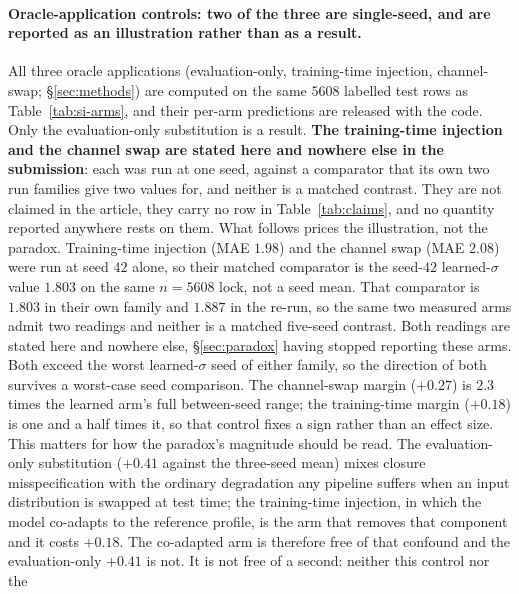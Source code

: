 \paragraph{Oracle-application controls: two of the three are single-seed, and are reported as an
illustration rather than as a result.} All three oracle applications (evaluation-only, training-time
injection, channel-swap; \S\ref{sec:methods}) are computed on the same $5608$ labelled test rows as
Table~\ref{tab:si-arms}, and their per-arm predictions are released with the code. Only the
evaluation-only substitution is a result. \textbf{The training-time injection and the channel swap
are stated here and nowhere else in the submission}: each was run at one seed, against a comparator
that its own two run families give two values for, and neither is a matched contrast. They are not
claimed in the article, they carry no row in Table~\ref{tab:claims}, and no quantity reported
anywhere rests on them. What follows prices the illustration, not the paradox.
Training-time injection (MAE $1.98$) and the channel swap (MAE $2.08$) were run at seed $42$ alone,
so their matched comparator is the seed-$42$ learned-$\sigma$ value $1.803$ on the same $n{=}5608$
lock, not a seed mean. That comparator is $1.803$ in their own family and $1.887$ in the re-run, so the same two measured
arms admit two readings and neither is a matched five-seed contrast. Both readings are stated here
and nowhere else, \S\ref{sec:paradox} having stopped reporting these arms. Both exceed the worst
learned-$\sigma$ seed of either family, so the direction of both survives a worst-case seed
comparison. The channel-swap margin ($+0.27$) is $2.3$ times the learned arm's full between-seed
range; the training-time margin ($+0.18$) is one and a half times it, so that control fixes a sign
rather than an effect size. This matters for how the paradox's magnitude should be read. The
evaluation-only substitution ($+0.41$ against the three-seed mean) mixes closure misspecification with
the ordinary degradation any pipeline suffers when an input distribution is swapped at test time; the
training-time injection, in which the model co-adapts to the reference profile, is the arm that
removes that component and it costs $+0.18$. The co-adapted arm is therefore free of that confound
and the evaluation-only $+0.41$ is not. It is not free of a second: neither this control nor the
